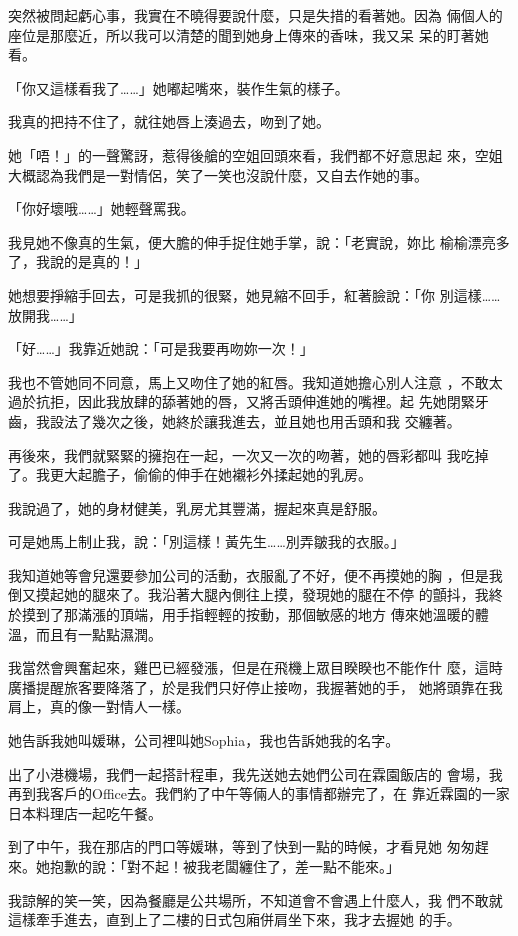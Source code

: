 突然被問起虧心事，我實在不曉得要說什麼，只是失措的看著她。因為
倆個人的座位是那麼近，所以我可以清楚的聞到她身上傳來的香味，我又呆
呆的盯著她看。

「你又這樣看我了……」她嘟起嘴來，裝作生氣的樣子。

我真的把持不住了，就往她唇上湊過去，吻到了她。

她「唔！」的一聲驚訝，惹得後艙的空姐回頭來看，我們都不好意思起
來，空姐大概認為我們是一對情侶，笑了一笑也沒說什麼，又自去作她的事。

「你好壞哦……」她輕聲罵我。

我見她不像真的生氣，便大膽的伸手捉住她手掌，說：「老實說，妳比
榆榆漂亮多了，我說的是真的！」


她想要掙縮手回去，可是我抓的很緊，她見縮不回手，紅著臉說：「你
別這樣……放開我……」

「好……」我靠近她說：「可是我要再吻妳一次！」

我也不管她同不同意，馬上又吻住了她的紅唇。我知道她擔心別人注意
，不敢太過於抗拒，因此我放肆的舔著她的唇，又將舌頭伸進她的嘴裡。起
先她閉緊牙齒，我設法了幾次之後，她終於讓我進去，並且她也用舌頭和我
交纏著。

再後來，我們就緊緊的擁抱在一起，一次又一次的吻著，她的唇彩都叫
我吃掉了。我更大起膽子，偷偷的伸手在她襯衫外揉起她的乳房。

我說過了，她的身材健美，乳房尤其豐滿，握起來真是舒服。

可是她馬上制止我，說：「別這樣！黃先生……別弄皺我的衣服。」

我知道她等會兒還要參加公司的活動，衣服亂了不好，便不再摸她的胸
，但是我倒又摸起她的腿來了。我沿著大腿內側往上摸，發現她的腿在不停
的顫抖，我終於摸到了那滿漲的頂端，用手指輕輕的按動，那個敏感的地方
傳來她溫暖的體溫，而且有一點點濕潤。

我當然會興奮起來，雞巴已經發漲，但是在飛機上眾目睽睽也不能作什
麼，這時廣播提醒旅客要降落了，於是我們只好停止接吻，我握著她的手，
她將頭靠在我肩上，真的像一對情人一樣。

她告訴我她叫媛琳，公司裡叫她Sophia，我也告訴她我的名字。

出了小港機場，我們一起搭計程車，我先送她去她們公司在霖園飯店的
會場，我再到我客戶的Office去。我們約了中午等倆人的事情都辦完了，在
靠近霖園的一家日本料理店一起吃午餐。

到了中午，我在那店的門口等媛琳，等到了快到一點的時候，才看見她
匆匆趕來。她抱歉的說：「對不起！被我老闆纏住了，差一點不能來。」

我諒解的笑一笑，因為餐廳是公共場所，不知道會不會遇上什麼人，我
們不敢就這樣牽手進去，直到上了二樓的日式包廂併肩坐下來，我才去握她
的手。


